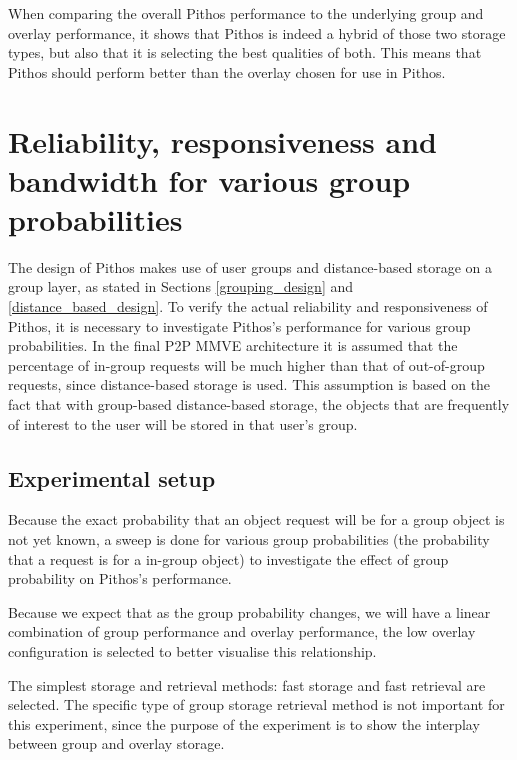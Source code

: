 When comparing the overall Pithos performance to the underlying group and overlay performance, it shows that Pithos is indeed a hybrid of those two storage types, but also that it is selecting the best qualities of both. This means that Pithos should perform better than the overlay chosen for use in Pithos.

\section{Reliability, responsiveness and bandwidth for various group probabilities}
\label{group_probability_results}

The design of Pithos makes use of user groups and distance-based storage on a group layer, as stated in Sections \ref{grouping_design} and \ref{distance_based_design}. To verify the actual reliability and responsiveness of Pithos, it is necessary to investigate Pithos's performance for various group probabilities. In the final P2P MMVE architecture it is assumed that the percentage of in-group requests will be much higher than that of out-of-group requests, since distance-based storage is used. This assumption is based on the fact that with group-based distance-based storage, the objects that are frequently of interest to the user will be stored in that user's group.

\subsection{Experimental setup}

Because the exact probability that an object request will be for a group object is not yet known, a sweep is done for various group probabilities (the probability that a request is for a in-group object) to investigate the effect of group probability on Pithos's performance.

Because we expect that as the group probability changes, we will have a linear combination of group performance and overlay performance, the low overlay configuration is selected to better visualise this relationship.

The simplest storage and retrieval methods: fast storage and fast retrieval are selected. The specific type of group storage retrieval method is not important for this experiment, since the purpose of the experiment is to show the interplay between group and overlay storage.

